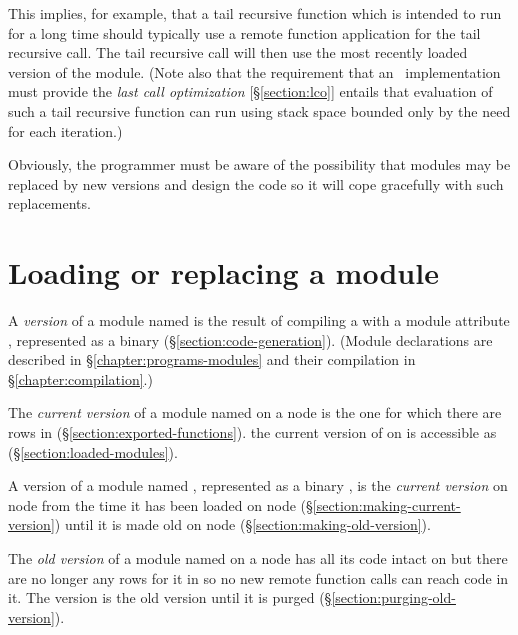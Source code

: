 This implies, for example, that a tail recursive function which is intended to run
for a long time should typically use a remote function application
for the tail recursive call.  The tail recursive call will then use
the most recently loaded version of the module.  (Note also that
\ifStd
the requirement that an \Erlang\ implementation must provide
\fi
\ifOld the \fi
\emph{last call optimization}
[\S\ref{section:lco}] entails that evaluation of such a tail recursive function
can run using stack space bounded only by the need for each iteration.)

Obviously, the programmer must be aware of the possibility that modules may be
replaced by new versions and design the code so it will cope gracefully with such
replacements.

\section{Loading or replacing a module}

\label{section:current-version}
\label{section:replacing-module}
\label{section:loading}

A \emph{version} of a module named  is the result of compiling a
 with a module attribute , represented
as a binary (\S\ref{section:code-generation}).
(Module declarations are described in \S\ref{chapter:programs-modules}
and their compilation in \S\ref{chapter:compilation}.)

The \emph{current version} of a module named  on a node  is the
one for which there are rows in  (\S\ref{section:exported-functions}).
the current version of  on  is accessible as
 (\S\ref{section:loaded-modules}).

A version of a module named , represented as a binary ,
is the \emph{current version} on node  from the time it has been loaded on node 
(\S\ref{section:making-current-version}) until it is made old
on node  (\S\ref{section:making-old-version}).

The \emph{old version} of a module named  on a node  has all its code
intact on  but there are no longer any rows for it in  so
no new remote function calls can reach code in it.  The version is the old version
until it is purged
(\S\ref{section:purging-old-version}).


